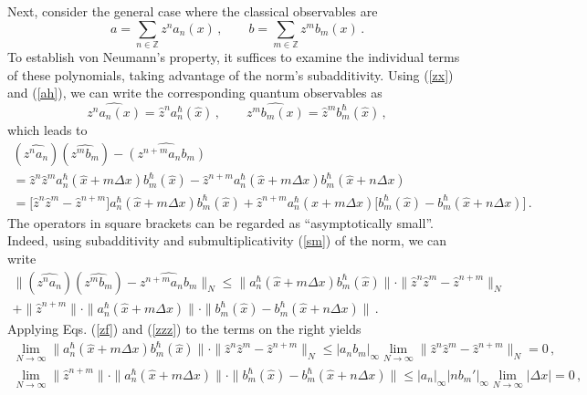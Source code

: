 \documentclass[12pt,a4paper]{article}
\numberwithin{equation}{section}
\theoremstyle{theorem}
\theoremstyle{remark}
\begin{document}
  Next, consider the general case where the classical observables are 
 \begin{equation}\label{ab}
  a=\sum_{n\in\mathbb{Z}}z^na_n(x)\,,\qquad b=\sum_{m\in\mathbb{Z}}z^mb_m(x)\,.
\end{equation}
  To establish von Neumann's property, it suffices  to examine the individual terms of these polynomials, taking advantage of the norm's subadditivity.  
  Using  (\ref{zx}) and (\ref{ah}), we can write the corresponding quantum observables as 
  \begin{equation}\label{za}
      \widehat{z^na_n(x)}=\hat z^n a_n^\hbar(\hat x)\,,\qquad  \widehat{z^mb_m(x)}=\hat z^m b_m^\hbar(\hat x)  \,,
      \end{equation}
      which leads to 
      \begin{equation}\label{dif}
      \begin{array}{c}
          (\widehat{z^na_n} ) (\widehat{z^mb_m})- \widehat{(z^{n+m}a_nb_m)}  \\[5mm]
     =\hat z^n\hat z^ma_n^\hbar(\hat x+m\Delta x)b_m^\hbar(\hat x)-\hat z^{n+m}a^\hbar_n(\hat x+m\Delta x) b_m^\hbar(\hat x+n\Delta x) \\[5mm]
      =\big[\hat z^n\hat z^m -\hat z^{n+m}\big]a_n^\hbar(\hat x+m\Delta x)b_m^\hbar(\hat x)+\hat z^{n+m}a^\hbar_n(\hat x+m\Delta x) \big[b_m^\hbar(\hat x)-b_m^\hbar(\hat x+n\Delta x) \big ]   \,.  
      \end{array}
      \end{equation}      The operators in square brackets can be regarded as ``asymptotically small''. Indeed, using subadditivity and submultiplicativity  (\ref{sm}) of the norm,  we can write 
      \begin{equation}
      \begin{array}{c}
            \|(\widehat{z^na_n} ) (\widehat{z^mb_m})- \widehat{z^{n+m}a_nb_m}\|_N   \leq \|a_n^\hbar(\hat x+m\Delta x)b_m^\hbar(\hat x)\| \cdot \|\hat z^n\hat z^m -\hat z^{n+m} \|_N\\[5mm]
            +\|\hat z^{n+m}\|\cdot\|a^\hbar_n(\hat x+m\Delta x)\|\cdot \|b_m^\hbar(\hat x)-b_m^\hbar(\hat x+n\Delta x)  \|\,.
            \end{array}
            \end{equation}
Applying  Eqs. (\ref{zf}) and (\ref{zzz}) to the terms on the right yields 
    $$ \begin{array}{l}
       \displaystyle  \lim_{N\to \infty}\|a_n^\hbar(\hat x+m\Delta x)b_m^\hbar(\hat x)\| \cdot \|\hat z^n\hat z^m -\hat z^{n+m} \|_N\leq |a_nb_m|_\infty \lim_{N\to\infty} \|\hat z^n\hat z^m -\hat z^{n+m} \|_N=0 \,,    \\[5mm]
      \displaystyle       \lim_{N\to\infty}\|\hat z^{n+m}\|\cdot\|a^\hbar_n(\hat x+m\Delta x)\|\cdot \|b_m^\hbar(\hat x)-b_m^\hbar(\hat x+n\Delta x)  \|       \leq |a_n|_\infty |n b_m'|_\infty\lim_{N\rightarrow \infty} |\Delta x| =0\,,
             \end{array}
             $$
\end{document}
